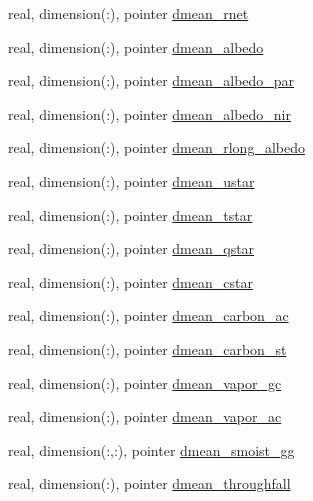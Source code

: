 \begin{DoxyCompactItemize}
\item 
real, dimension(\+:), pointer \hyperlink{structed__state__vars_1_1edtype_aa0db50daada45db0d283507ed68fdd3c}{dmean\+\_\+rnet}
\item 
real, dimension(\+:), pointer \hyperlink{structed__state__vars_1_1edtype_adb0945bf53177ff6c94234331325987e}{dmean\+\_\+albedo}
\item 
real, dimension(\+:), pointer \hyperlink{structed__state__vars_1_1edtype_a9c7f7e43d27518f48cd20605705445eb}{dmean\+\_\+albedo\+\_\+par}
\item 
real, dimension(\+:), pointer \hyperlink{structed__state__vars_1_1edtype_a63b6336682d6a5cc83989e160f147531}{dmean\+\_\+albedo\+\_\+nir}
\item 
real, dimension(\+:), pointer \hyperlink{structed__state__vars_1_1edtype_a1e76594f79652c31c8d227be0f5f3bb3}{dmean\+\_\+rlong\+\_\+albedo}
\item 
real, dimension(\+:), pointer \hyperlink{structed__state__vars_1_1edtype_a0f82f0e5e92037e86a9813d72df939f2}{dmean\+\_\+ustar}
\item 
real, dimension(\+:), pointer \hyperlink{structed__state__vars_1_1edtype_a2fcc0b3f4822643c473b14d77e1a782e}{dmean\+\_\+tstar}
\item 
real, dimension(\+:), pointer \hyperlink{structed__state__vars_1_1edtype_a5d84b8e5d985166975c9c46e691ef866}{dmean\+\_\+qstar}
\item 
real, dimension(\+:), pointer \hyperlink{structed__state__vars_1_1edtype_ae2886607d25b610599cfb27f17b7079d}{dmean\+\_\+cstar}
\item 
real, dimension(\+:), pointer \hyperlink{structed__state__vars_1_1edtype_a80141926de94ec8084c3ffefde6ffbb8}{dmean\+\_\+carbon\+\_\+ac}
\item 
real, dimension(\+:), pointer \hyperlink{structed__state__vars_1_1edtype_ae8727824c11f888b03a6f2c939bd631e}{dmean\+\_\+carbon\+\_\+st}
\item 
real, dimension(\+:), pointer \hyperlink{structed__state__vars_1_1edtype_afa48b01bd3ea96bfa61914fc166c4e62}{dmean\+\_\+vapor\+\_\+gc}
\item 
real, dimension(\+:), pointer \hyperlink{structed__state__vars_1_1edtype_aa3e6d1918c386ba9c9101342133c47c6}{dmean\+\_\+vapor\+\_\+ac}
\item 
real, dimension(\+:,\+:), pointer \hyperlink{structed__state__vars_1_1edtype_aac4c2972cb88b9da2730b95604f9cb2c}{dmean\+\_\+smoist\+\_\+gg}
\item 
real, dimension(\+:), pointer \hyperlink{structed__state__vars_1_1edtype_a0cfc7d56bce6d943059d96af7cb7689d}{dmean\+\_\+throughfall}

\end{DoxyCompactItemize}
